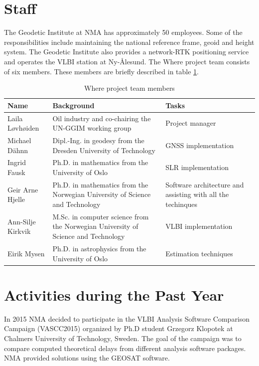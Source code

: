 \documentclass[twocolumn,twoside]{svmultivs_br} %
\begin{document}
\section{Staff}
The Geodetic Institute at NMA has approximately 50 employees. Some of the responsibilities include maintaining the national reference frame, geoid and height system. The Geodetic Institute also provides a network-RTK positioning service and operates the VLBI station at Ny-\AA lesund. The Where project team consists of six members. These members are briefly described in table \ref{tab:staff}.
\begin{table}[htb!]
\caption{Where project team members}
\begin{center}
\begin{tabular}{p{}|p{}|p{}}
\hline
Name & Background & Tasks \\
\hline
Laila L\o vh\o iden & Oil industry and co-chairing the UN-GGIM working group & Project manager \\
Michael D\"ahnn & Dipl.-Ing. in geodesy from the Dresden University of Technology & GNSS implementation \\
Ingrid Fausk & Ph.D. in mathematics from the University of Oslo & SLR implementation \\
Geir Arne Hjelle & Ph.D. in mathematics from the Norwegian University of Science and Technology & Software architecture and assisting with all the techinques \\
Ann-Silje Kirkvik & M.Sc. in computer science from the Norwegian University of Science and Technology & VLBI implementation \\
Eirik Mysen & Ph.D. in astrophysics from the University of Oslo & Estimation techniques \\
\hline
\end{tabular}
\end{center}
\label{tab:staff}
\end{table}


\section{Activities during the Past Year}
In 2015 NMA decided to participate in the VLBI Analysis Software Comparison Campaign (VASCC2015) organized by Ph.D student Grzegorz Klopotek at Chalmers University of Technology, Sweden. The goal of the campaign was to compare computed theoretical delays from different analysis software packages. NMA provided solutions using the GEOSAT software. 
\end{document}
